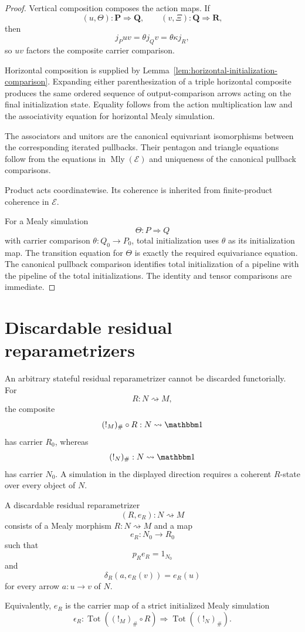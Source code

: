 \begin{proof}
Vertical composition composes the action maps. If
\[
  (u,\Theta):\mathbf P\Longrightarrow\mathbf Q,
  \qquad
  (v,\Xi):\mathbf Q\Longrightarrow\mathbf R,
\]
then
\[
  j_Puv
  =
  \theta j_Qv
  =
  \theta\kappa j_R,
\]
so \(uv\) factors the composite carrier comparison.

Horizontal composition is supplied by
Lemma~\ref{lem:horizontal-initialization-comparison}. Expanding either parenthesization of a triple
horizontal composite produces the same ordered sequence of output-comparison arrows acting on the
final initialization state. Equality follows from the action multiplication law and the
associativity equation for horizontal Mealy simulation.

The associators and unitors are the canonical equivariant isomorphisms between the corresponding
iterated pullbacks. Their pentagon and triangle equations follow from the equations in
\(\operatorname{Mly}(\mathcal E)\) and uniqueness of the canonical pullback comparisons.

Product acts coordinatewise. Its coherence is inherited from finite-product coherence in
\(\mathcal E\).

For a Mealy simulation
\[
  \Theta:P\Longrightarrow Q
\]
with carrier comparison \(\theta:Q_0\to P_0\), total initialization uses \(\theta\) as its
initialization map. The transition equation for \(\Theta\) is exactly the required equivariance
equation. The canonical pullback comparison identifies total initialization of a pipeline with the
pipeline of the total initializations. The identity and tensor comparisons are immediate.
\end{proof}

\section{Discardable residual reparametrizers}
\label{sec:discardable-residual-reparametrizers}

An arbitrary stateful residual reparametrizer cannot be discarded functorially. For
\[
  R:N\rightsquigarrow M,
\]
the composite
\[
  (!_M)_\#\circ R:N\rightsquigarrow\mathbbm1
\]
has carrier \(R_0\), whereas
\[
  (!_N)_\#:N\rightsquigarrow\mathbbm1
\]
has carrier \(N_0\). A simulation in the displayed direction requires a coherent \(R\)-state over
every object of \(N\).

\begin{definition}
\label{def:discardable-residual-reparametrizer}
A discardable residual reparametrizer
\[
  (R,e_R):N\rightsquigarrow M
\]
consists of a Mealy morphism \(R:N\rightsquigarrow M\) and a map
\[
  e_R:N_0\longrightarrow R_0
\]
such that
\[
  p_Re_R=1_{N_0}
\]
and
\[
  \delta_R(a,e_R(v))
  =
  e_R(u)
\]
for every arrow \(a:u\to v\) of \(N\).

Equivalently, \(e_R\) is the carrier map of a strict initialized Mealy simulation
\[
  \epsilon_R:
  \operatorname{Tot}((!_M)_\#\circ R)
  \Longrightarrow
  \operatorname{Tot}((!_N)_\#).
\]
\end{definition}

